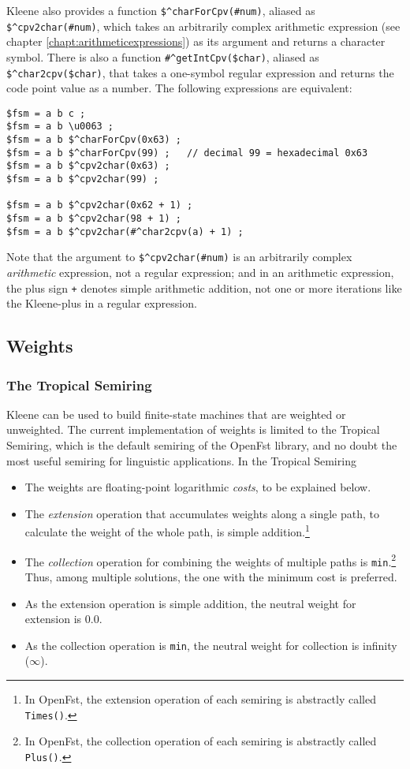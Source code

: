 Kleene also provides a function \verb!$^charForCpv(#num)!, aliased as \verb!$^cpv2char(#num)!, which takes an arbitrarily
complex arithmetic expression (see chapter \ref{chapt:arithmeticexpressions}) as its argument
and returns a character symbol.  There is also a function \verb!#^getIntCpv($char)!, aliased as
\verb!$^char2cpv($char)!, that takes a one-symbol regular expression and returns the code point value as a
number.  The following expressions are equivalent:


\begin{Verbatim}
$fsm = a b c ;
$fsm = a b \u0063 ;
$fsm = a b $^charForCpv(0x63) ;
$fsm = a b $^charForCpv(99) ;   // decimal 99 = hexadecimal 0x63
$fsm = a b $^cpv2char(0x63) ;
$fsm = a b $^cpv2char(99) ;

$fsm = a b $^cpv2char(0x62 + 1) ;
$fsm = a b $^cpv2char(98 + 1) ;
$fsm = a b $^cpv2char(#^char2cpv(a) + 1) ;
\end{Verbatim}

\noindent
Note that the argument to \verb!$^cpv2char(#num)! is an arbitrarily complex 
\emph{arithmetic} expression, not a regular expression;
and in an arithmetic expression, the plus sign \verb!+! denotes simple arithmetic addition, not one or more
iterations like the Kleene-plus in a regular expression.


\subsection{Weights}

\subsubsection{The Tropical Semiring}  

Kleene can be used to build finite-state machines that are weighted or unweighted.
The current implementation of weights is limited to the
Tropical Semiring, which is the default semiring of the OpenFst library, and no doubt
the most useful semiring for linguistic applications.
In the Tropical Semiring

\begin{itemize}
\item
The weights are floating-point logarithmic \emph{costs}, to be explained below.
\item
The \emph{extension} operation that accumulates weights along a single
path, to calculate the weight of the whole path, is simple addition.\footnote{In OpenFst, the extension operation of
each
semiring is abstractly called \texttt{Times()}.}
\item
The \emph{collection} operation for combining the weights of multiple
paths is \texttt{min}.\footnote{In OpenFst, the collection
operation of each semiring is abstractly called \texttt{Plus()}.}
Thus, among multiple solutions, the one with the minimum cost is preferred.
\item
As the extension operation is simple addition, the neutral weight for extension is 0.0.  
\item
As the collection operation is \texttt{min}, the neutral weight for collection is infinity ($\infty$).
\end{itemize}

